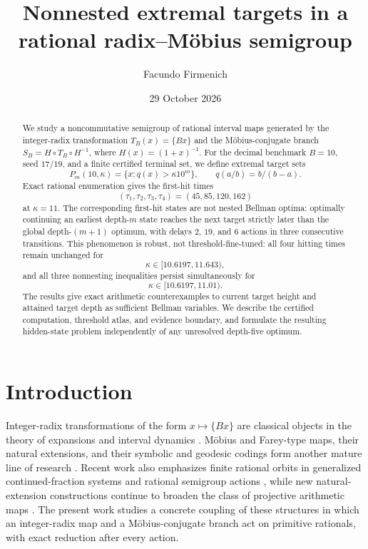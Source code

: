 \documentclass[11pt]{amsart}
\title[Nonnested extremal targets]{Nonnested extremal targets in a rational radix--M\"obius semigroup}
\author{Facundo Firmenich}
\date{29 October 2026}
\theoremstyle{definition}
\begin{document}
\begin{abstract}
We study a noncommutative semigroup of rational interval maps generated by the integer-radix transformation $T_B(x)=\{Bx\}$ and the M\"obius-conjugate branch $S_B=H\circ T_B\circ H^{-1}$, where $H(x)=(1+x)^{-1}$.  For the decimal benchmark $B=10$, seed $17/19$, and a finite certified terminal set, we define extremal target sets
\[
P_m(10,\kappa)=\{x:q(x)>\kappa 10^m\},\qquad q(a/b)=b/(b-a).
\]
Exact rational enumeration gives the first-hit times
\[
(\tau_1,\tau_2,\tau_3,\tau_4)=(45,85,120,162)
\]
at $\kappa=11$.  The corresponding first-hit states are not nested Bellman optima: optimally continuing an earliest depth-$m$ state reaches the next target strictly later than the global depth-$(m+1)$ optimum, with delays $2$, $19$, and $6$ actions in three consecutive transitions.  This phenomenon is robust, not threshold-fine-tuned: all four hitting times remain unchanged for
\[
\kappa\in[10.6197,11.643),
\]
and all three nonnesting inequalities persist simultaneously for
\[
\kappa\in[10.6197,11.01).
\]
The results give exact arithmetic counterexamples to current target height and attained target depth as sufficient Bellman variables.  We describe the certified computation, threshold atlas, and evidence boundary, and formulate the resulting hidden-state problem independently of any unresolved depth-five optimum.
\end{abstract}

\maketitle

\section{Introduction}

Integer-radix transformations of the form $x\mapsto\{Bx\}$ are classical objects in the theory of expansions and interval dynamics \cite{Renyi1957Representations,Parry1960On,Dajani2002Ergodic}.  M\"obius and Farey-type maps, their natural extensions, and their symbolic and geodesic codings form another mature line of research \cite{Nakada1981Metrical,Series1985The,Isola2003On,Panti2026There,Schmidt2025First,Dajani2026Inducing}.  Recent work also emphasizes finite rational orbits in generalized continued-fraction systems and rational semigroup actions \cite{Berthe2025Multidimensional,Javaheri2026Transitive}, while new natural-extension constructions continue to broaden the class of projective arithmetic maps \cite{Chen2026Strange,Fox2026Natural,Nakada2026Farey}.  The present work studies a concrete coupling of these structures in which an integer-radix map and a M\"obius-conjugate branch act on primitive rationals, with exact reduction after every action.
\end{document}
